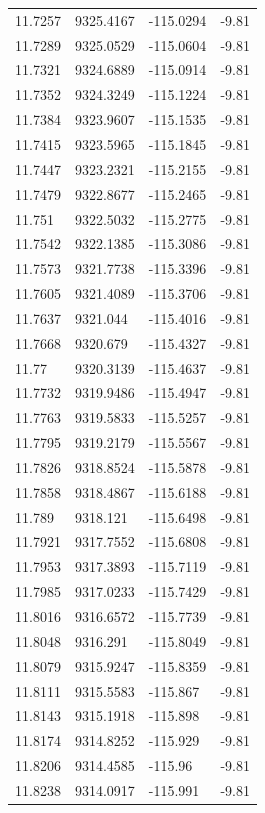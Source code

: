 \begin{table}[H]
\begin{tabular}{llll}
11.7257 & 9325.4167 & -115.0294 & -9.81 \\
11.7289 & 9325.0529 & -115.0604 & -9.81 \\
11.7321 & 9324.6889 & -115.0914 & -9.81 \\
11.7352 & 9324.3249 & -115.1224 & -9.81 \\
11.7384 & 9323.9607 & -115.1535 & -9.81 \\
11.7415 & 9323.5965 & -115.1845 & -9.81 \\
11.7447 & 9323.2321 & -115.2155 & -9.81 \\
11.7479 & 9322.8677 & -115.2465 & -9.81 \\
11.751 & 9322.5032 & -115.2775 & -9.81 \\
11.7542 & 9322.1385 & -115.3086 & -9.81 \\
11.7573 & 9321.7738 & -115.3396 & -9.81 \\
11.7605 & 9321.4089 & -115.3706 & -9.81 \\
11.7637 & 9321.044 & -115.4016 & -9.81 \\
11.7668 & 9320.679 & -115.4327 & -9.81 \\
11.77 & 9320.3139 & -115.4637 & -9.81 \\
11.7732 & 9319.9486 & -115.4947 & -9.81 \\
11.7763 & 9319.5833 & -115.5257 & -9.81 \\
11.7795 & 9319.2179 & -115.5567 & -9.81 \\
11.7826 & 9318.8524 & -115.5878 & -9.81 \\
11.7858 & 9318.4867 & -115.6188 & -9.81 \\
11.789 & 9318.121 & -115.6498 & -9.81 \\
11.7921 & 9317.7552 & -115.6808 & -9.81 \\
11.7953 & 9317.3893 & -115.7119 & -9.81 \\
11.7985 & 9317.0233 & -115.7429 & -9.81 \\
11.8016 & 9316.6572 & -115.7739 & -9.81 \\
11.8048 & 9316.291 & -115.8049 & -9.81 \\
11.8079 & 9315.9247 & -115.8359 & -9.81 \\
11.8111 & 9315.5583 & -115.867 & -9.81 \\
11.8143 & 9315.1918 & -115.898 & -9.81 \\
11.8174 & 9314.8252 & -115.929 & -9.81 \\
11.8206 & 9314.4585 & -115.96 & -9.81 \\
11.8238 & 9314.0917 & -115.991 & -9.81 \\

\end{tabular}
\end{table}
